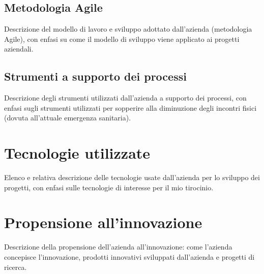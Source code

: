 \subsection{Metodologia Agile}
Descrizione del modello di lavoro e sviluppo adottato dall'azienda (metodologia Agile), con enfasi su come il modello di sviluppo viene applicato ai progetti aziendali.

\subsection{Strumenti a supporto dei processi}
Descrizione degli strumenti utilizzati dall'azienda a supporto dei processi, con enfasi sugli strumenti utilizzati per sopperire alla diminuzione degli incontri fisici (dovuta all'attuale emergenza sanitaria).


\section{Tecnologie utilizzate}
Elenco e relativa descrizione delle tecnologie usate dall'azienda per lo sviluppo dei progetti, con enfasi sulle tecnologie di interesse per il mio tirocinio.


\section{Propensione all'innovazione}
Descrizione della propensione dell'azienda all'innovazione: come l'azienda concepisce l'innovazione, prodotti innovativi sviluppati dall'azienda e progetti di ricerca.
